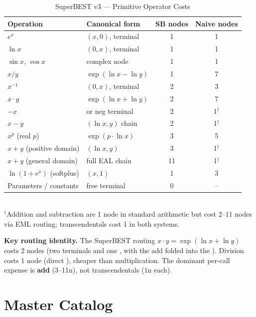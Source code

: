 \documentclass[12pt,a4paper]{article}
\theoremstyle{definition}
\newcommand{\EML}{\operatorname{EML}}
\newcommand{\EDL}{\operatorname{EDL}}
\newcommand{\EXL}{\operatorname{EXL}}
\newcommand{\EAL}{\operatorname{EAL}}
\newcommand{\DEML}{\operatorname{DEML}}
\newcommand{\LEAd}{\operatorname{LEAd}}
\begin{document}
\begin{table}[ht]
\centering
\caption{SuperBEST v3 --- Primitive Operator Costs}
\label{tab:routing}
\begin{tabular}{llcc}
\toprule
\textbf{Operation} & \textbf{Canonical form} & \textbf{SB nodes} & \textbf{Naive nodes} \\
\midrule
$e^x$                      & \EML$(x,0)$, terminal & 1  & 1 \\
$\ln x$                    & \EXL$(0,x)$, terminal & 1  & 1 \\
$\sin x,\,\cos x$          & complex \EML node     & 1  & 1 \\
$x / y$                    & $\exp(\ln x - \ln y)$ & 1  & 7 \\
$x^{-1}$                   & \EDL$(0,x)$, terminal & 2  & 3 \\
$x \cdot y$                & $\exp(\ln x + \ln y)$ & 2  & 7 \\
$-x$                       & \DEML or neg terminal & 2  & 1$^\dagger$ \\
$x - y$                    & \EML$(\ln x, y)$ chain & 2 & 1$^\dagger$ \\
$x^p$ (real $p$)           & $\exp(p \cdot \ln x)$ & 3  & 5 \\
$x + y$ (positive domain)  & \EAL$(\ln x, y)$      & 3  & 1$^\dagger$ \\
$x + y$ (general domain)   & full EAL chain        & 11 & 1$^\dagger$ \\
$\ln(1+e^x)$ (softplus)    & \LEAd$(x,1)$          & 1  & 3 \\
Parameters / constants     & free terminal         & 0  & -- \\
\bottomrule
\end{tabular}
\vspace{4pt}\\
\small $^\dagger$Addition and subtraction are 1 node in standard arithmetic
but cost 2--11 nodes via EML routing; transcendentals cost 1 in both systems.
\end{table}

\noindent
\textbf{Key routing identity.}
The SuperBEST routing $x \cdot y = \exp(\ln x + \ln y)$ costs 2 nodes
(two \EXL terminals and one \EML, with the add folded into the \EML).
Division costs 1 node (direct \EDL), cheaper than multiplication.
The dominant per-call expense is \textbf{add} (3--11n), not transcendentals
(1n each).

\section{Master Catalog}
\label{sec:catalog}
\end{document}
